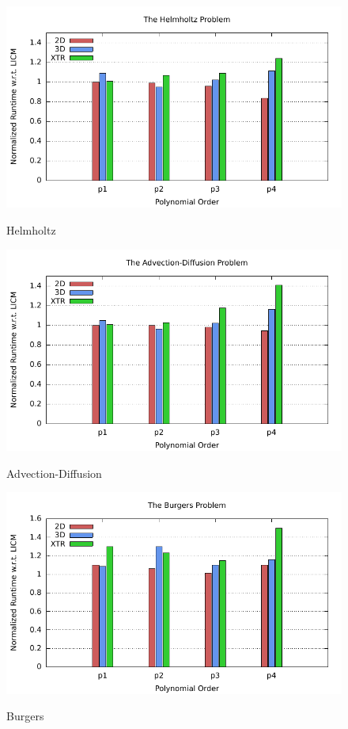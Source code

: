 \documentclass[conference]{IEEEtran}
\begin{document}
\begin{figure}[h]
\centerline{\includegraphics[scale=0.7]{Pictures/helmholtz-normalized.pdf}
\label{fig_first_case}}
\caption{Helmholtz}
\end{figure}

\begin{figure}[h]
\centerline{\includegraphics[scale=0.7]{Pictures/advdiff-normalized.pdf}
\label{fig_first_case}}
\caption{Advection-Diffusion}
\end{figure}

\begin{figure}[h]
\centerline{\includegraphics[scale=0.7]{Pictures/burgers-normalized.pdf}
\label{fig_first_case}}
\caption{Burgers}
\end{figure}
\end{document}
